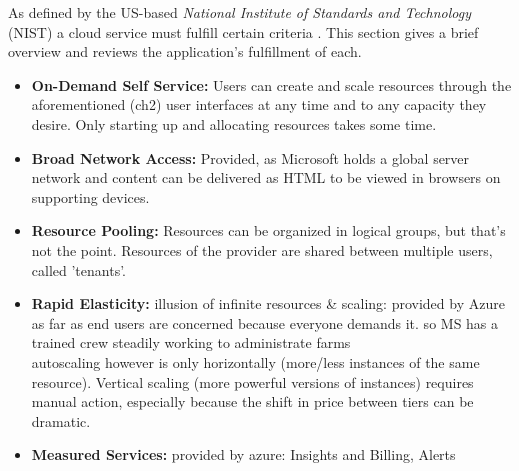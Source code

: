 As defined by the US-based \textit{National Institute of Standards and Technology} (NIST) a cloud service must fulfill
certain criteria \cite{nistCloud}. This section gives a brief overview and reviews the application's fulfillment of each.
\begin{itemize}
    \item \textbf{On-Demand Self Service:} Users can create and scale resources through the aforementioned (ch2) user interfaces at any time and to any capacity they desire. Only starting up and allocating resources takes some time.
    \item \textbf{Broad Network Access:} Provided, as Microsoft holds a global server network and content can be delivered as HTML to be viewed in browsers on supporting devices.
    \item \textbf{Resource Pooling:} Resources can be organized in logical groups, but that's not the point. Resources of the provider are shared between multiple users, called 'tenants'.
    \item \textbf{Rapid Elasticity:} illusion of infinite resources \& scaling: provided by Azure as far as end users are concerned because everyone demands it. so MS has a trained 
    crew steadily working to administrate farms\\
    autoscaling however is only horizontally (more/less instances of the same resource). Vertical scaling (more powerful versions of instances) requires manual action, especially because the shift in price between tiers can be dramatic.
    \item \textbf{Measured Services:} provided by azure: Insights and Billing, Alerts
\end{itemize}
